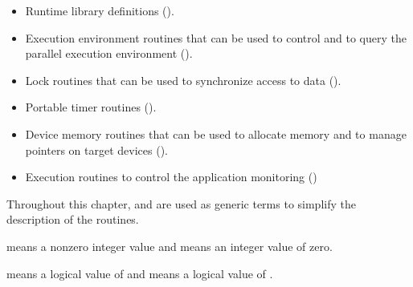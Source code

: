 \begin{itemize}
\item Runtime library definitions
().

\item Execution environment routines that can be used to control and to query the parallel
execution environment
().

\item Lock routines that can be used to synchronize access to data
().

\item Portable timer routines
().

\item Device memory routines that can be used to allocate memory and
to manage pointers on target devices ().



\item Execution routines to control the application monitoring
()
\end{itemize}

Throughout this chapter,  and  are used as generic terms to simplify the
description of the routines.

\begin{samepage}
\begin{ccppspecific}
 means a nonzero integer value and  means an integer value of zero.
\end{ccppspecific}
\end{samepage}
\bigskip

\begin{samepage}
\begin{fortranspecific}
 means a logical value of  and  means a logical value of .
\end{fortranspecific}
\end{samepage}
\bigskip


